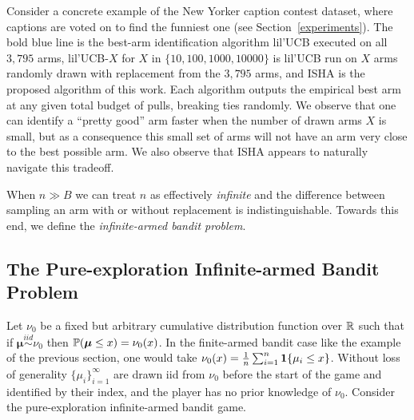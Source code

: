 Consider a concrete example of the New Yorker caption contest dataset,
where captions are voted on to find the funniest one (see Section~\ref{experiments}).
The bold blue line is the best-arm identification algorithm lil'UCB \citep{Jamieson2014lilU} executed on all $3,795$ arms, lil'UCB-$X$ for $X$ in $\{10,100,1000,10000\}$ is lil'UCB run on $X$ arms randomly drawn with replacement from the $3,795$ arms, and ISHA is the proposed algorithm of this work. Each algorithm outputs the empirical best arm at any given total budget of pulls, breaking ties randomly.
We observe that one can identify a ``pretty good'' arm faster when the number of drawn arms $X$ is small, but as a consequence this small set of arms will not have an arm very close to the best possible arm.
We also observe that ISHA appears to naturally navigate this tradeoff.  

When $n \gg B$ we can treat $n$ as effectively \emph{infinite} and the difference between sampling an arm with or without replacement is indistinguishable. 
Towards this end, we define the \emph{infinite-armed bandit problem}.

\subsection{The Pure-exploration Infinite-armed Bandit Problem}
Let $\nu_0$ be a fixed but arbitrary cumulative distribution function over $\R$ such that if $\boldsymbol{\mu} \overset{iid}{\sim} \nu_0$ then $\P(\boldsymbol{\mu} \leq x) = \nu_0(x)$. 
In the finite-armed bandit case like the example of the previous section, one would take $\nu_0(x) = \frac{1}{n} \sum_{i=1}^n \1\{\mu_i \leq x \}$.
Without loss of generality $\{\mu_i\}_{i=1}^\infty$ are drawn iid from $\nu_0$ before the start of the game and identified by their index, and the player has no prior knowledge of $\nu_0$.
Consider the pure-exploration infinite-armed bandit game.

